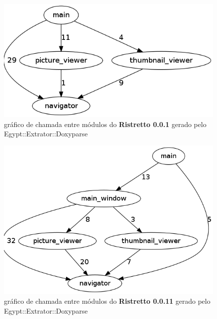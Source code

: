 \begin{figure}
\center
\includegraphics[scale=0.5]{imagens/ristretto-0_0_1-doxyparse-2}
\caption{gráfico de chamada entre módulos do {\bf Ristretto 0.0.1} gerado pelo Egypt::Extrator::Doxyparse}
\label{ristretto-0.0.1-doxyparse-2}
\end{figure}

\begin{figure}
\center
\includegraphics[scale=0.5]{imagens/ristretto-0_0_11-doxyparse-2}
\caption{gráfico de chamada entre módulos do {\bf Ristretto 0.0.11} gerado pelo Egypt::Extrator::Doxyparse}
\label{ristretto-0.0.11-doxyparse-2}
\end{figure}

